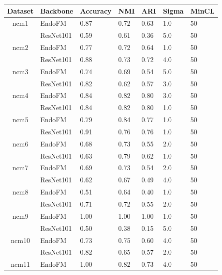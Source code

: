 \begin{table}[h]
\small
\setlength\tabcolsep{3pt}
    \centering
    \vspace{-0.05in}
    \begin{tabular}{cllllll}
    \toprule
        Dataset & Backbone & Accuracy & NMI & ARI & Sigma & MinCL \\
        \midrule
    \multirow{2}{*}{ncm1}
 & EndoFM & 0.87 & 0.72 & 0.63 & 1.0 & 50 \\
     & ResNet101 & 0.59 & 0.61 & 0.36 & 5.0 & 50 \\
    \midrule
    \multirow{2}{*}{ncm2}
 & EndoFM & 0.77 & 0.72 & 0.64 & 1.0 & 50 \\
     & ResNet101 & 0.88 & 0.73 & 0.72 & 4.0 & 50 \\
    \midrule
    \multirow{2}{*}{ncm3}
 & EndoFM & 0.74 & 0.69 & 0.54 & 5.0 & 50 \\
     & ResNet101 & 0.82 & 0.62 & 0.57 & 3.0 & 50 \\
    \midrule
    \multirow{2}{*}{ncm4}
 & EndoFM & 0.84 & 0.82 & 0.80 & 3.0 & 50 \\
     & ResNet101 & 0.84 & 0.82 & 0.80 & 1.0 & 50 \\
    \midrule
    \multirow{2}{*}{ncm5}
 & EndoFM & 0.79 & 0.84 & 0.77 & 1.0 & 50 \\
     & ResNet101 & 0.91 & 0.76 & 0.76 & 1.0 & 50 \\
    \midrule
    \multirow{2}{*}{ncm6}
 & EndoFM & 0.68 & 0.73 & 0.55 & 2.0 & 50 \\
     & ResNet101 & 0.63 & 0.79 & 0.62 & 1.0 & 50 \\
    \midrule
    \multirow{2}{*}{ncm7}
 & EndoFM & 0.69 & 0.73 & 0.54 & 2.0 & 50 \\
     & ResNet101 & 0.62 & 0.67 & 0.49 & 4.0 & 50 \\
    \midrule
    \multirow{2}{*}{ncm8}
 & EndoFM & 0.51 & 0.64 & 0.40 & 1.0 & 50 \\
     & ResNet101 & 0.71 & 0.72 & 0.55 & 2.0 & 50 \\
    \midrule
    \multirow{2}{*}{ncm9}
 & EndoFM & 1.00 & 1.00 & 1.00 & 1.0 & 50 \\
     & ResNet101 & 0.50 & 0.38 & 0.15 & 5.0 & 50 \\
    \midrule
    \multirow{2}{*}{ncm10}
 & EndoFM & 0.73 & 0.75 & 0.60 & 4.0 & 50 \\
     & ResNet101 & 0.82 & 0.65 & 0.57 & 2.0 & 50 \\
    \midrule
    \multirow{2}{*}{ncm11}
 & EndoFM & 1.00 & 0.82 & 0.73 & 4.0 & 50 \\

\end{tabular}
\end{table}
